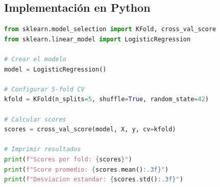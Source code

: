 \documentclass[12pt]{article}
\begin{document}
\subsection{Implementación en Python}
\begin{lstlisting}[language=Python]
from sklearn.model_selection import KFold, cross_val_score
from sklearn.linear_model import LogisticRegression

# Crear el modelo
model = LogisticRegression()

# Configurar 5-fold CV
kfold = KFold(n_splits=5, shuffle=True, random_state=42)

# Calcular scores
scores = cross_val_score(model, X, y, cv=kfold)

# Imprimir resultados
print(f"Scores por fold: {scores}")
print(f"Score promedio: {scores.mean():.3f}")
print(f"Desviacion estandar: {scores.std():.3f}")
\end{lstlisting}
\end{document}
